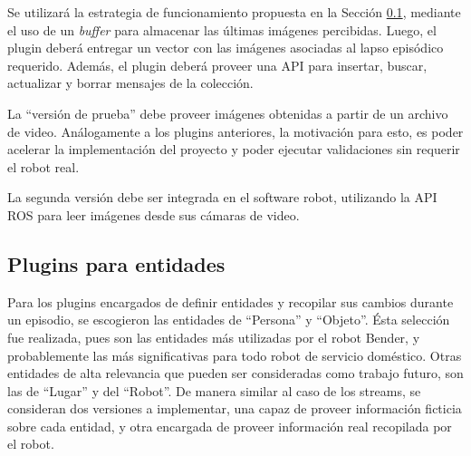 
Se utilizará la estrategia de funcionamiento propuesta en la Sección \ref{}, mediante el uso de un \textit{buffer} para almacenar las últimas imágenes percibidas. Luego, el plugin deberá entregar un vector con las imágenes asociadas al lapso episódico requerido. Además, el plugin deberá proveer una API para insertar, buscar, actualizar y borrar mensajes de la colección.

La ``versión de prueba'' debe proveer imágenes obtenidas a partir de un archivo de video. Análogamente a los plugins anteriores, la motivación para esto, es poder acelerar la implementación del proyecto y poder ejecutar validaciones sin requerir el robot real.

La segunda versión debe ser integrada en el software robot, utilizando la API ROS para leer imágenes desde sus cámaras de video.


\subsection{Plugins para entidades}

Para los plugins encargados de definir entidades y recopilar sus cambios durante un episodio, se escogieron las entidades de ``Persona'' y ``Objeto''. Ésta selección fue realizada, pues son las entidades más utilizadas por el robot Bender, y probablemente las más significativas para todo robot de servicio doméstico. Otras entidades de alta relevancia que pueden ser consideradas como trabajo futuro, son las de ``Lugar'' y del ``Robot''. De manera similar al caso de los streams, se consideran dos versiones a implementar, una capaz de proveer información ficticia sobre cada entidad, y otra encargada de proveer información real recopilada por el robot.




















